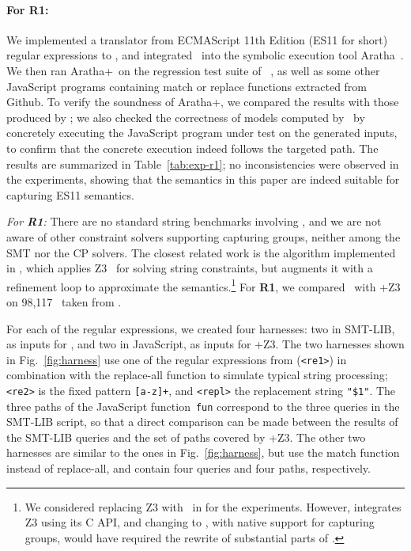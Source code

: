 %
\OMIT
{
\paragraph{For \textbf{R1}:} We implemented a translator from ECMAScript 11th Edition (ES11 for short) regular
expressions to \regexps, and integrated \ostrich\ into the symbolic
execution tool Aratha~\cite{aratha}. We then ran Aratha+\ostrich\ on
the regression test suite of \expose{}~\cite{DBLP:conf/spin/LoringMK17},
as well as some other JavaScript programs containing match or replace
functions extracted from Github. To verify the soundness of
Aratha+\ostrich, we compared the results with those produced by
\expose{}; we also checked the correctness of models computed by
\ostrich\ by concretely executing the JavaScript program under test on
the generated inputs, to confirm that the concrete execution indeed
follows the targeted path. The results are summarized in Table~\ref{tab:exp-r1};
no inconsistencies were observed in the experiments, showing that the
semantics in this paper are indeed suitable for capturing ES11
semantics.
}
\smallskip
{\em For \textbf{R1}:} There are no standard string benchmarks
involving \regexps, and we are not aware of other constraint solvers
supporting capturing groups, neither among the SMT nor the CP
solvers. %
The closest related work is the algorithm implemented in \expose{}, which
applies Z3~\cite{Z3} for solving string constraints, but augments
it with a refinement loop to approximate the {\regexp}
semantics.\footnote{We considered replacing Z3 with \ostrich\ in
  \expose{} for the experiments. However, \expose{} integrates Z3 using its
  C API, and changing to \ostrich, with native support
  for capturing groups, would have required the rewrite of substantial
  parts of \expose{}.}
%
For \textbf{R1}, we compared \ostrich\ with \expose{}+Z3 on 98,117
\regexps\ taken from \cite{DMC+19}.

For each of the regular expressions, we created four harnesses: two in
SMT-LIB, as inputs for \ostrich, and two in JavaScript, as inputs for
\expose{}+Z3. The two harnesses shown in Fig.~\ref{fig:harness} use one of the
regular expressions from \cite{DMC+19} (\verb!<re1>!) in combination with
the replace-all function to simulate typical string processing;
\verb!<re2>! is the fixed pattern \verb![a-z]+!, and \verb!<repl>! the
replacement string \verb!"$1"!. The three paths of the JavaScript
function~\verb!fun! correspond to the three queries in the SMT-LIB
script, so that a direct comparison can be made between the results of
the SMT-LIB queries and the set of paths covered by \expose{}+Z3. The other
two harnesses are similar to the ones in Fig.~\ref{fig:harness}, but
use the match function instead of replace-all, and contain four
queries and four paths, respectively.


